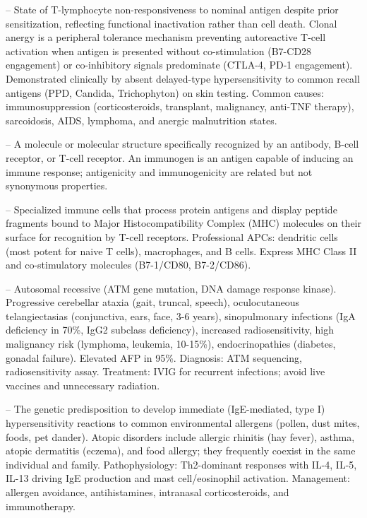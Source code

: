 -- State of T-lymphocyte non-responsiveness to nominal antigen despite prior sensitization, reflecting functional inactivation rather than cell death. Clonal anergy is a peripheral tolerance mechanism preventing autoreactive T-cell activation when antigen is presented without co-stimulation (B7-CD28 engagement) or co-inhibitory signals predominate (CTLA-4, PD-1 engagement). Demonstrated clinically by absent delayed-type hypersensitivity to common recall antigens (PPD, Candida, Trichophyton) on skin testing. Common causes: immunosuppression (corticosteroids, transplant, malignancy, anti-TNF therapy), sarcoidosis, AIDS, lymphoma, and anergic malnutrition states.

-- A molecule or molecular structure specifically recognized by an antibody, B-cell receptor, or T-cell receptor. An immunogen is an antigen capable of inducing an immune response; antigenicity and immunogenicity are related but not synonymous properties.

-- Specialized immune cells that process protein antigens and display peptide fragments bound to Major Histocompatibility Complex (MHC) molecules on their surface for recognition by T-cell receptors. Professional APCs: dendritic cells (most potent for naive T cells), macrophages, and B cells. Express MHC Class II and co-stimulatory molecules (B7-1/CD80, B7-2/CD86).

-- Autosomal recessive (ATM gene mutation, DNA damage response kinase). Progressive cerebellar ataxia (gait, truncal, speech), oculocutaneous telangiectasias (conjunctiva, ears, face, 3-6 years), sinopulmonary infections (IgA deficiency in 70\%, IgG2 subclass deficiency), increased radiosensitivity, high malignancy risk (lymphoma, leukemia, 10-15\%), endocrinopathies (diabetes, gonadal failure). Elevated AFP in 95\%. Diagnosis: ATM sequencing, radiosensitivity assay. Treatment: IVIG for recurrent infections; avoid live vaccines and unnecessary radiation.

-- The genetic predisposition to develop immediate (IgE-mediated, type I) hypersensitivity reactions to common environmental allergens (pollen, dust mites, foods, pet dander). Atopic disorders include allergic rhinitis (hay fever), asthma, atopic dermatitis (eczema), and food allergy; they frequently coexist in the same individual and family. Pathophysiology: Th2-dominant responses with IL-4, IL-5, IL-13 driving IgE production and mast cell/eosinophil activation. Management: allergen avoidance, antihistamines, intranasal corticosteroids, and immunotherapy.

